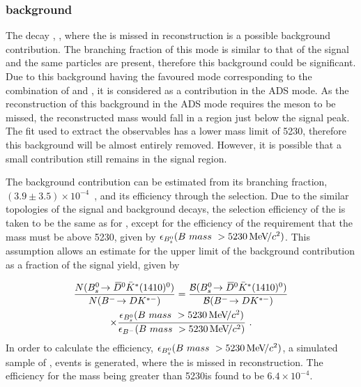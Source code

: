 \subsubsection{\boldmath {} background}
\label{sec:backgrounds:bs}

The decay , , where the \pip is missed in reconstruction is a possible background contribution. The branching fraction of this mode is similar to that of the signal and the same particles are present, therefore this background could be significant. Due to this background having the favoured mode corresponding to the combination of \Dzb and \Kstarm, it is considered as a contribution in the ADS mode. As the reconstruction of this background in the ADS mode requires the \pip meson to be missed, the reconstructed \Bm mass would fall in a region just below the signal peak. The fit used to extract the \CP observables has a lower mass limit of 5230\mevcc, therefore this background will be almost entirely removed. However, it is possible that a small contribution still remains in the signal region. 

The  background contribution can be estimated from its branching fraction, $\left(3.9 \pm 3.5\right) \times 10^{-4}$~\cite{PDG2016}, and its efficiency through the \btodkst selection. Due to the similar topologies of the signal and background decays, the selection efficiency of the  is taken to be the same as for \btodkst, except for the efficiency of the requirement that the \Bm mass must be above 5230\mevcc, given by $\epsilon_{{{B}^0_{s}}}(B\ mass\ > 5230{\mathrm{\,Me\kern -0.1em V\!/}c^2})$. This assumption allows an estimate for the upper limit of the background contribution as a fraction of the signal yield, given by 

\begin{multline}
\frac{N(\decay{\Bs}{\Dzb\bar{K}^{*}(1410)^0})}{N(\btodkst)} = \frac{\BF(\decay{\Bs}{\Dzb\bar{K}^{*}(1410)^0})}{\BF(\btodkst)} \\ \times \frac{\epsilon_{\Bs}(B\ mass\ > 5230\mevcc)}{\epsilon_{\Bm}(B\ mass\ > 5230\mevcc)} \text { .}
\label{Bscalc}
\end{multline}
In order to calculate the efficiency, $\epsilon_{{{B}^0_{s}}}(B\ mass\ > 5230{\mathrm{\,Me\kern -0.1em V\!/}c^2})$, a simulated sample of ,  events is generated, where the \pip is missed in reconstruction. The efficiency for the \Bm mass being greater than 5230\mevcc is found to be $6.4 \times 10^{-4}$. 

